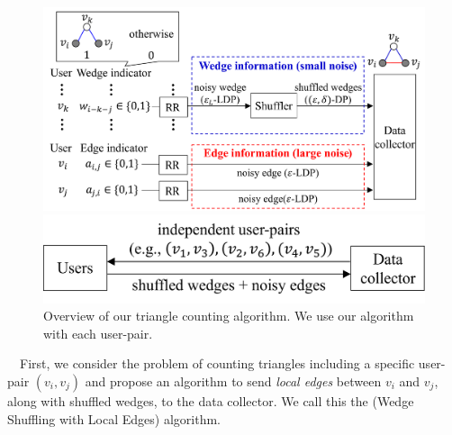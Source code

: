 \begin{figure}[t]
  \centering
  \includegraphics[width=0.99\linewidth]{fig/local_edges.pdf}
  \vspace{-2mm}
  \caption{Overview of our \AlgWSLE{} (Wedge Shuffling with Local Edges) algorithm with inputs $v_i$ and $v_j$. 
  }
  \label{chap3-fig:local_edges}
\vspace{2mm}
  \centering
  \includegraphics[width=0.7\linewidth]{fig/sampling_pairs.pdf}
  \vspace{-2mm}
  \caption{Overview of our triangle counting algorithm. 
  We use our 
  \AlgWSLE{} 
  algorithm with each user-pair.
  }
  \label{chap3-fig:triangle_count}
\end{figure}

\smallskip
{}~~First, we consider the problem of counting triangles including a specific user-pair $(v_i, v_j)$ and propose an algorithm to send 
\textit{local edges} between $v_i$ and $v_j$, along with shuffled wedges, to the data collector. 
We call this the \AlgWSLE{} (Wedge Shuffling with Local Edges) algorithm. 

